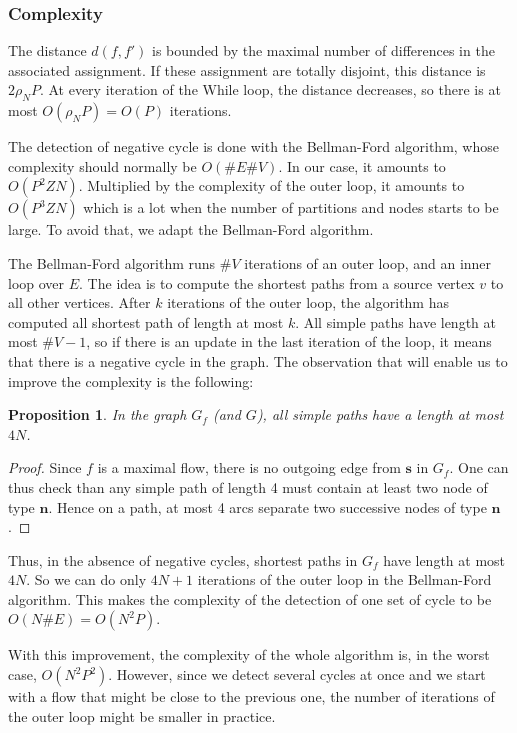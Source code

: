 \documentclass[]{article}
\newtheorem{proposition}{Proposition}
\begin{document}
\subsubsection*{Complexity}
The distance $d(f,f')$ is bounded by the maximal number of differences in the associated assignment. If these assignment are totally disjoint, this distance is $2\rho_N P$. At every iteration of the While loop, the distance decreases, so there is at most $O(\rho_N P) = O(P)$ iterations.

The detection of negative cycle is done with the Bellman-Ford algorithm, whose complexity should normally be $O(\#E\#V)$. In our case, it amounts to $O(P^2ZN)$. Multiplied by the complexity of the outer loop, it amounts to $O(P^3ZN)$ which is a lot when the number of partitions and nodes starts to be large. To avoid that, we adapt the Bellman-Ford algorithm.

The Bellman-Ford algorithm runs $\#V$ iterations of an outer loop, and an inner loop over $E$. The idea is to compute the shortest paths from a source vertex $v$ to all other vertices. After $k$ iterations of the outer loop, the algorithm has computed all shortest path of length at most $k$. All simple paths have length at most $\#V-1$, so if there is an update in the last iteration of the loop, it means that there is a negative cycle in the graph. The observation that will enable us to improve the complexity is the following:

\begin{proposition}
	In the graph $G_f$ (and $G$), all simple paths have a length at most $4N$.
\end{proposition}
\begin{proof}
	Since $f$ is a maximal flow, there is no outgoing edge from $\mathbf{s}$ in $G_f$. One can thus check than any simple path of length 4 must contain at least two node of type $\mathbf{n}$. Hence on a path, at most 4 arcs separate two successive nodes of type $\mathbf{n}$. 
\end{proof}

Thus, in the absence of negative cycles, shortest paths in $G_f$ have length at most $4N$. So we can do only $4N+1$ iterations of the outer loop in the Bellman-Ford algorithm. This makes the complexity of the detection of one set of cycle to be $O(N\#E) = O(N^2 P)$.

With this improvement, the complexity of the whole algorithm is, in the worst case, $O(N^2P^2)$. However, since we detect several cycles at once and we start with a flow that might be close to the previous one, the number of iterations of the outer loop might be smaller in practice.
\end{document}
